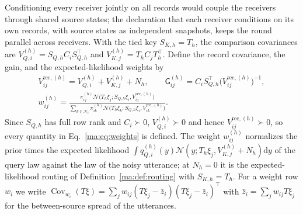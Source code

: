 \documentclass[11pt]{article}
\theoremstyle{definition}
\theoremstyle{remark}
\newcommand{\Nset}{\mathcal N}
\newcommand{\Gauss}{\mathcal N}
\newcommand{\G}{\mathsf G}
\newcommand{\Cov}{\operatorname{Cov}}
\begin{document}
Conditioning every receiver jointly on all records would couple the receivers through shared source states; the declaration that each receiver conditions on its own records, with source states as independent snapshots, keeps the round parallel across receivers. With the tied key $S_{K,h}=T_h$, the comparison covariances are $V^{(h)}_{Q,i}=S_{Q,h}C_iS_{Q,h}^\top$ and $V^{(h)}_{K,j}=T_hC_jT_h^\top$. Define the record covariance, the gain, and the expected-likelihood weights by
\begin{equation}
\begin{gathered}
V^{\mathrm{rec},(h)}_{ij}=V^{(h)}_{Q,i}+V^{(h)}_{K,j}+N_h,\qquad
\G^{(h)}_{ij}=C_iS_{Q,h}^\top\bigl(V^{\mathrm{rec},(h)}_{ij}\bigr)^{-1},\\
w^{(h)}_{ij}=\frac{\pi^{(h)}_{ij}\Gauss\bigl(T_h\xi_j;S_{Q,h}\xi_i,V^{\mathrm{rec},(h)}_{ij}\bigr)}{\sum_{k\in\Nset_i}\pi^{(h)}_{ik}\Gauss\bigl(T_h\xi_k;S_{Q,h}\xi_i,V^{\mathrm{rec},(h)}_{ik}\bigr)}.
\end{gathered}
\label{ma:eq:weights}
\end{equation}
Since $S_{Q,h}$ has full row rank and $C_i\succ0$, $V^{(h)}_{Q,i}\succ0$ and hence $V^{\mathrm{rec},(h)}_{ij}\succ0$, so every quantity in Eq.~\eqref{ma:eq:weights} is defined. The weight $w^{(h)}_{ij}$ normalizes the prior times the expected likelihood $\int q^{(h)}_{Q,i}(y)\Gauss(y;T_h\xi_j,V^{(h)}_{K,j}+N_h)\mathrm dy$ of the query law against the law of the noisy utterance; at $N_h=0$ it is the expected-likelihood routing of Definition~\ref{ma:def:routing} with $S_{K,h}=T_h$. For a weight row $w_i$ we write $\Cov_{w_i}(T\xi)=\sum_jw_{ij}(T\xi_j-\bar z_i)(T\xi_j-\bar z_i)^\top$ with $\bar z_i=\sum_jw_{ij}T\xi_j$ for the between-source spread of the utterances.
\end{document}
